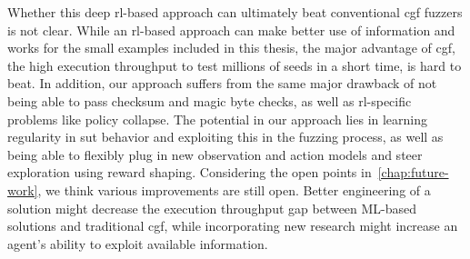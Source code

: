 Whether this deep \gls{rl}-based approach can ultimately beat conventional \gls{cgf} fuzzers
is not clear.
While an \gls{rl}-based approach can make better use of information and works
for the small examples included in this thesis, the major advantage of
\gls{cgf}, the high execution throughput to test millions of seeds in a
short time, is hard to beat.
In addition, our approach suffers from the same major drawback of not being able
to pass checksum and magic byte checks, as well as \gls{rl}-specific problems like policy collapse.
The potential in our approach lies in learning regularity in \gls{sut} behavior and exploiting
this in the fuzzing process, as well as being able to flexibly plug in new observation
and action models and steer exploration using reward shaping.
Considering the open points in~\cref{chap:future-work}, we think various
improvements are still open.
Better engineering of a solution might decrease the execution throughput gap between ML-based
solutions and traditional \gls{cgf}, while incorporating new research might increase
an agent's ability to exploit available information.
